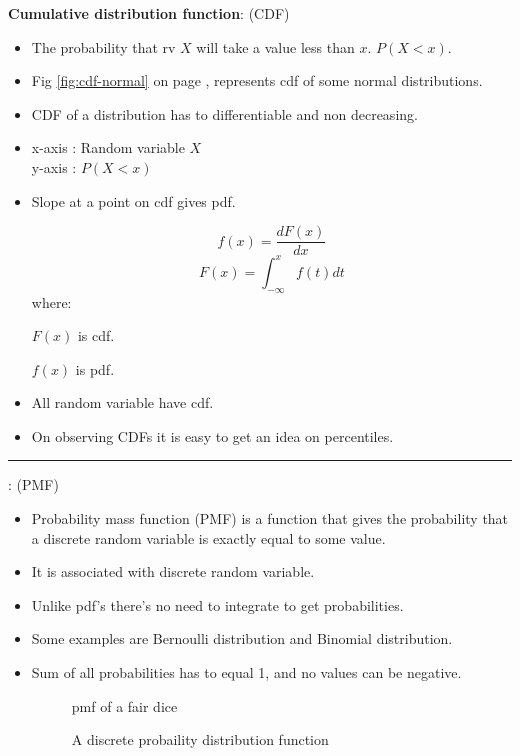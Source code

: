 \documentclass[	DIV=calc,%
paper=a4,%
fontsize=11pt,%
twocolumn]{scrartcl} %
\newcommand{\hformbar}[1]{\vspace{5pt}\hrule\vspace{10pt}} %
\newcommand{\formdesc}[1]{\noindent\textbf{#1}}
\begin{document}
\formdesc{Cumulative distribution function}: (CDF)

\begin{itemize}
	\item The probability that rv $X$ will take a value less than $x$. $P(X<x)$.
	\item Fig \ref{fig:cdf-normal} on page \pageref{fig:cdf-normal}, represents cdf of some normal distributions.
	\item CDF of a distribution has to differentiable and non decreasing.
	\item x-axis : Random variable $X$ \\ y-axis : $P(X<x)$
	\item Slope at a point on cdf gives pdf.
	
	\begin{equation}
		f(x)=\frac{dF(x)}{dx}
	\end{equation}
	\begin{equation}
		F(x)=\int_{-\infty}^{x}f(t) dt
	\end{equation}
where:

	$F(x)$ is cdf.
	
	$f(x)$ is pdf.
	
	\item All random variable have cdf.
	\item  On observing CDFs it is easy to get an idea on percentiles.
\end{itemize}

\hformbar

\formdesc{Probability mass function}: (PMF)

\begin{itemize}
	\item Probability mass function (PMF) is a function that gives the probability that a discrete random variable is exactly equal to some value.
	\item It is associated with discrete random variable.
	\item Unlike pdf's there's no need to integrate to get probabilities.
	\item Some examples are Bernoulli distribution and Binomial distribution.
	\item Sum of all probabilities has to equal 1, and no values can be negative. 
	\begin{figure}[ht!]
		\centering
		\caption{pmf of a fair dice}
		\graphicspath{ {images/math/} }
		
	\end{figure}
	
	\begin{figure}[ht!]
		\centering
		\caption{A discrete probaility distribution function}
		\graphicspath{ {images/math/} }
		
	\end{figure}

\end{itemize}
\end{document}
